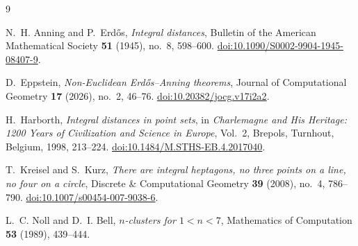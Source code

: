 \documentclass[11pt]{article}
\begin{document}
\begin{thebibliography}{9}

N.~H. Anning and P.~Erdős,
\emph{Integral distances},
Bulletin of the American Mathematical Society \textbf{51} (1945), no.~8, 598--600.
\href{https://doi.org/10.1090/S0002-9904-1945-08407-9}{doi:10.1090/S0002-9904-1945-08407-9}.

D.~Eppstein,
\emph{Non-Euclidean Erdős--Anning theorems},
Journal of Computational Geometry \textbf{17} (2026), no.~2, 46--76.
\href{https://doi.org/10.20382/jocg.v17i2a2}{doi:10.20382/jocg.v17i2a2}.

H.~Harborth,
\emph{Integral distances in point sets},
in \emph{Charlemagne and His Heritage: 1200 Years of Civilization and Science in Europe}, Vol.~2, Brepols, Turnhout, Belgium, 1998, 213--224.
\href{https://doi.org/10.1484/M.STHS-EB.4.2017040}{doi:10.1484/M.STHS-EB.4.2017040}.

T.~Kreisel and S.~Kurz,
\emph{There are integral heptagons, no three points on a line, no four on a circle},
Discrete \& Computational Geometry \textbf{39} (2008), no.~4, 786--790.
\href{https://doi.org/10.1007/s00454-007-9038-6}{doi:10.1007/s00454-007-9038-6}.

L.~C. Noll and D.~I. Bell,
\emph{\(n\)-clusters for \(1<n<7\)},
Mathematics of Computation \textbf{53} (1989), 439--444.

\end{thebibliography}
\end{document}
